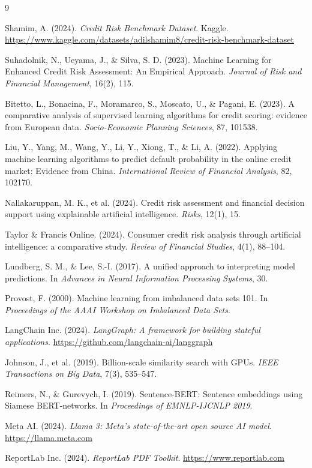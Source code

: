 \documentclass[11pt,a4paper]{article}
\begin{document}
\begin{thebibliography}{9}

Shamim, A. (2024). \textit{Credit Risk Benchmark Dataset}. Kaggle. 
\url{https://www.kaggle.com/datasets/adilshamim8/credit-risk-benchmark-dataset}

Suhadolnik, N., Ueyama, J., \& Silva, S. D. (2023). Machine Learning for Enhanced 
Credit Risk Assessment: An Empirical Approach. \textit{Journal of Risk and 
Financial Management}, 16(2), 115.

Bitetto, L., Bonacina, F., Moramarco, S., Moscato, U., \& Pagani, E. (2023). A 
comparative analysis of supervised learning algorithms for credit scoring: evidence 
from European data. \textit{Socio-Economic Planning Sciences}, 87, 101538.

Liu, Y., Yang, M., Wang, Y., Li, Y., Xiong, T., \& Li, A. (2022). Applying machine 
learning algorithms to predict default probability in the online credit market: 
Evidence from China. \textit{International Review of Financial Analysis}, 82, 102170.

Nallakaruppan, M. K., et al. (2024). Credit risk assessment and financial decision 
support using explainable artificial intelligence. \textit{Risks}, 12(1), 15.

Taylor \& Francis Online. (2024). Consumer credit risk analysis through artificial 
intelligence: a comparative study. \textit{Review of Financial Studies}, 4(1), 88--104.

Lundberg, S. M., \& Lee, S.-I. (2017). A unified approach to interpreting model 
predictions. In \textit{Advances in Neural Information Processing Systems}, 30.

Provost, F. (2000). Machine learning from imbalanced data sets 101. In 
\textit{Proceedings of the AAAI Workshop on Imbalanced Data Sets}.

LangChain Inc. (2024). \textit{LangGraph: A framework for building stateful applications}. 
\url{https://github.com/langchain-ai/langgraph}

Johnson, J., et al. (2019). Billion-scale similarity search with GPUs. 
\textit{IEEE Transactions on Big Data}, 7(3), 535--547.

Reimers, N., \& Gurevych, I. (2019). Sentence-BERT: Sentence embeddings using 
Siamese BERT-networks. In \textit{Proceedings of EMNLP-IJCNLP 2019}.

Meta AI. (2024).
\textit{Llama 3: Meta's state-of-the-art open source AI model}.
\url{https://llama.meta.com}

ReportLab Inc. (2024).
\textit{ReportLab PDF Toolkit}.
\url{https://www.reportlab.com}

\end{thebibliography}
\end{document}
